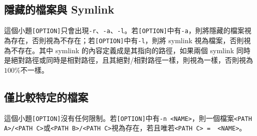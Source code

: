 \subsection{隱藏的檔案與 Symlink}

這個小題\texttt{[OPTION]}只會出現\texttt{-r}、\texttt{-a}、\texttt{-l}。若\texttt{[OPTION]}中有\texttt{-a}，則將隱藏的檔案視為存在，否則視為不存在；若\texttt{[OPTION]}中有\texttt{-l}，則將 symlink 視為檔案，否則視為不存在。其中 symlink 的內容定義成是其指向的路徑，如果兩個 symlink 同時是絕對路徑或同時是相對路徑，且其絕對/相對路徑一樣，則視為一樣，否則視為$100\%$不一樣。

\subsection{僅比較特定的檔案}

這個小題\texttt{[OPTION]}沒有任何限制。若\texttt{[OPTION]}中有\texttt{-n <NAME>}，則一個檔案\texttt{<PATH A>/<PATH C>}或\texttt{<PATH B>/<PATH C>}視為存在，若且唯若\texttt{<PATH C> =~ <NAME>}。
